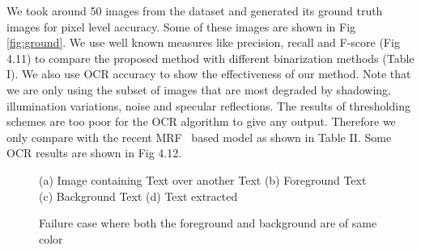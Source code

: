 We took around 50
images from the dataset and generated its ground truth images for pixel level accuracy.
Some of these images are shown in Fig \ref{fig:ground}.
We use well known measures like precision, recall and F-score (Fig 4.11) %
to compare the proposed method with different binarization methods (Table I).
We also use OCR accuracy to show the effectiveness of our method. Note that we are only
using the subset of images that are most degraded by shadowing, illumination variations,
noise and specular reflections. The results of thresholding schemes are too poor for the
OCR algorithm to give any output. Therefore we only compare with the recent MRF~\cite{A16}
based model as shown in Table II. Some OCR results are shown in Fig 4.12. %

\begin{figure}[t]
\centering
{}
\caption
{(a) Image containing Text over another Text (b) Foreground Text (c) Background Text (d)
Text extracted}
\caption
{Failure case where both the foreground and background are of same color}
\label{fig:7}
\end{figure}
